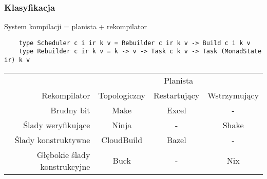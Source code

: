 \begin{frame}[fragile]
  \frametitle{Klasyfikacja}
  \begin{center}
    System kompilacji = planista + rekompilator
  \end{center}
  
  \begin{lstlisting}
    type Scheduler c i ir k v = Rebuilder c ir k v -> Build c i k v
    type Rebuilder c ir k v = k -> v -> Task c k v -> Task (MonadState ir) k v
  \end{lstlisting}



  {\small
  \vspace{-0.5em}
  \begin{center}
  \begin{tabular}{r | c c c}
    \hline
                                 & \multicolumn{3}{c}{Planista} \\
    Rekompilator                 & Topologiczny & Restartujący & Wstrzymujący \\
    \hline
    Brudny bit                   & Make         & Excel        & - \\
    Ślady weryfikujące           & Ninja        & -            & Shake \\
    Ślady konstruktywne          & CloudBuild   & Bazel        & -\\
    Głębokie ślady konstrukcyjne & Buck         & -            & Nix \\
    \hline
  \end{tabular}
  \end{center}}
\end{frame}
